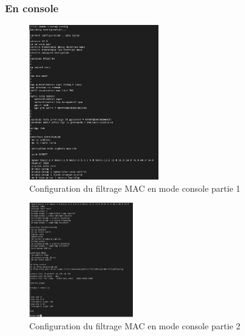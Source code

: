 \documentclass[12pt, a4paper]{article}
\begin{document}
        \subsubsection{En console}
        \begin{figure}[H]
            \centering
            \includegraphics[width=0.5\textwidth]{img/console1.png}
            \caption{Configuration du filtrage MAC en mode console partie 1}
            \label{fig:console1}
        \end{figure}
        \begin{figure}[H]
            \centering
            \includegraphics[width=0.4\textwidth]{img/console2.png}
            \caption{Configuration du filtrage MAC en mode console partie 2}
            \label{fig:console2}
        \end{figure}


    
\end{document}

